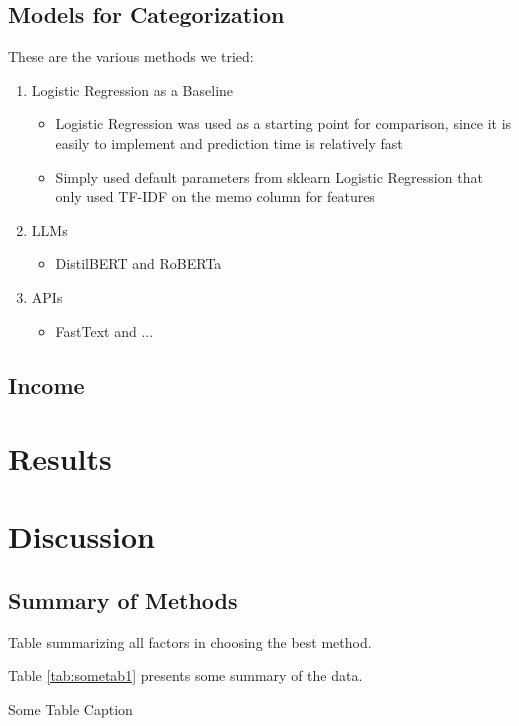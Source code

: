 \documentclass[12pt,letterpaper]{article}
\begin{document}
\subsection{Models for Categorization}
These are the various methods we tried:
    \begin{enumerate}
        \item {Logistic Regression as a Baseline}
            \begin{itemize}
                \item {Logistic Regression was used as a starting point for comparison, since it is easily to implement and prediction time is relatively fast}
                \item {Simply used default parameters from sklearn Logistic Regression that only used TF-IDF on the memo column for features}
            \end{itemize}
        \item {LLMs}
            \begin{itemize}
                \item {DistilBERT and RoBERTa}
            \end{itemize}
        \item {APIs}
            \begin{itemize}
                \item {FastText and ...}
            \end{itemize}
    \end{enumerate}

\subsection{Income}


\section{Results}


\section{Discussion}
\subsection{Summary of Methods}
Table summarizing all factors in choosing the best method.

Table \ref{tab:sometab1} presents some summary of the data.

\begin{table}[htbp]
\caption{Some Table Caption}
\label{tab:sometab1}
\resizebox{0.4\linewidth}{!}{}
\end{table}
\end{document}
